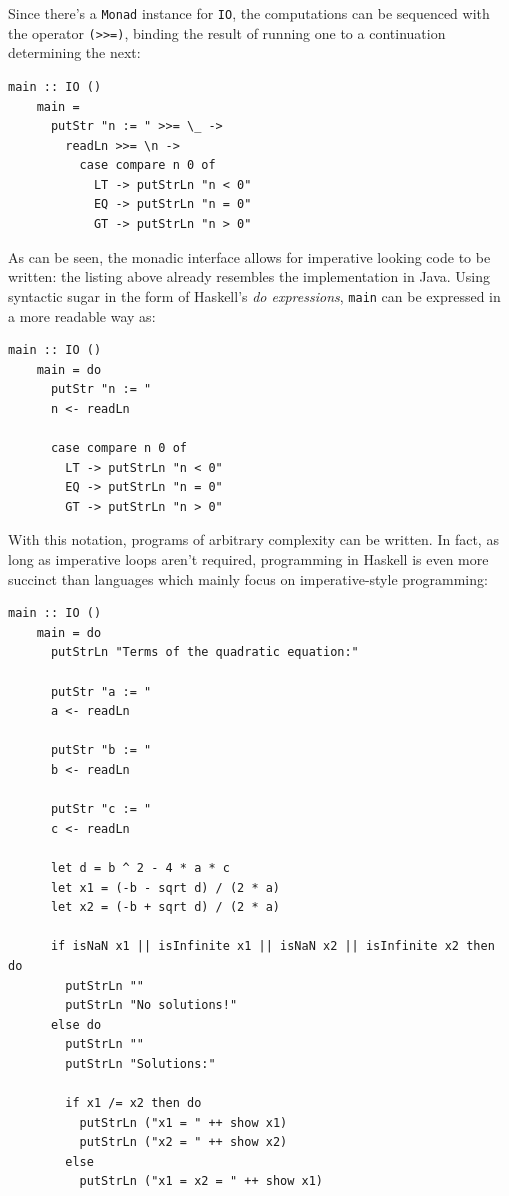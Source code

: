 \documentclass[UdineBachThesis,american,11pt]{PhdThesis}
\begin{document}
  Since there's a \mbox{\texttt{Monad}} instance for \mbox{\texttt{IO}}, the
  computations can be sequenced with the operator \mbox{\texttt{(>>=)}}, binding
  the result of running one to a continuation determining the next:

  \begin{Verbatim}[gobble=4,fontsize=\small]
    main :: IO ()
    main =
      putStr "n := " >>= \_ ->
        readLn >>= \n ->
          case compare n 0 of
            LT -> putStrLn "n < 0"
            EQ -> putStrLn "n = 0"
            GT -> putStrLn "n > 0"
  \end{Verbatim}

  As can be seen, the monadic interface allows for imperative looking code to be
  written: the listing above already resembles the implementation in Java. Using
  syntactic sugar in the form of Haskell's \emph{do expressions},
  \mbox{\texttt{main}} can be expressed in a more readable way as:

  \begin{Verbatim}[gobble=4,fontsize=\small]
    main :: IO ()
    main = do
      putStr "n := "
      n <- readLn

      case compare n 0 of
        LT -> putStrLn "n < 0"
        EQ -> putStrLn "n = 0"
        GT -> putStrLn "n > 0"
  \end{Verbatim}

  With this notation, programs of arbitrary complexity can be written. In fact,
  as long as imperative loops aren't required, programming in Haskell is even
  more succinct than languages which mainly focus on imperative-style
  programming:

  \begin{Verbatim}[gobble=4,fontsize=\small]
    main :: IO ()
    main = do
      putStrLn "Terms of the quadratic equation:"

      putStr "a := "
      a <- readLn

      putStr "b := "
      b <- readLn

      putStr "c := "
      c <- readLn

      let d = b ^ 2 - 4 * a * c
      let x1 = (-b - sqrt d) / (2 * a)
      let x2 = (-b + sqrt d) / (2 * a)

      if isNaN x1 || isInfinite x1 || isNaN x2 || isInfinite x2 then do
        putStrLn ""
        putStrLn "No solutions!"
      else do
        putStrLn ""
        putStrLn "Solutions:"

        if x1 /= x2 then do
          putStrLn ("x1 = " ++ show x1)
          putStrLn ("x2 = " ++ show x2)
        else
          putStrLn ("x1 = x2 = " ++ show x1)
  \end{Verbatim}
\end{document}
